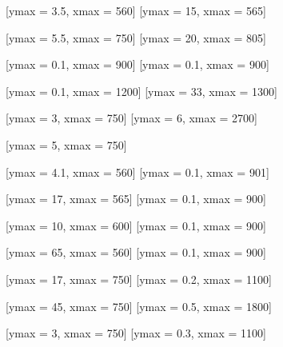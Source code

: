 \documentclass[tikz]{standalone}
\begin{document}


\begin{minipage}[t]{600pt}
\begin{table*}

\end{table*}
\end{minipage}

\begin{minipage}[t]{600pt}
\begin{table*}

\end{table*}
\end{minipage}


[ymax = 3.5, xmax = 560]
[ymax = 15, xmax = 565]

[ymax = 5.5, xmax =  750]
[ymax =  20, xmax = 805]

[ymax = 0.1, xmax = 900]
[ymax = 0.1, xmax = 900]

[ymax =   0.1, xmax = 1200]
[ymax =   33, xmax = 1300]

[ymax =   3, xmax = 750]
[ymax =   6, xmax = 2700]

[ymax =   5, xmax = 750]

[ymax = 4.1, xmax = 560]
[ymax = 0.1, xmax = 901]

[ymax = 17, xmax = 565]
[ymax = 0.1, xmax = 900]

[ymax =  10, xmax = 600]
[ymax = 0.1, xmax = 900]

[ymax =  65, xmax = 560]
[ymax = 0.1, xmax = 900]

[ymax =  17, xmax =  750]
[ymax = 0.2, xmax = 1100]

[ymax =  45, xmax = 750]
[ymax = 0.5, xmax = 1800]

[ymax =   3, xmax = 750]
[ymax = 0.3, xmax = 1100]
\end{document}

